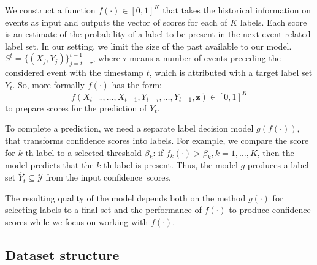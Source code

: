 \documentclass[runningheads]{llncs}
\newcommand{\vecX}{\mathbf{x}}
\begin{document}

We construct a function $f(\cdot) \in [0, 1]^K$ that takes the historical information on events as input and outputs the vector of scores for each of $K$ labels. Each score is an estimate of the probability of a label to be present in the next event-related label set.
In our setting, we limit the size of the past available to our model.
$S^t = \{(X_{j}, Y_{j})\}_{j = t - \tau}^{t-1}$, where $\tau$ means a number of events preceding the considered event with the timestamp $t$, which is attributed with a target label set $Y_{t}$.
So, more formally $f(\cdot)$ has the form:
$$
f(X_{t - \tau}, \ldots, X_{t-1}, Y_{t - \tau}, \ldots, Y_{t-1}, \textbf{z}) \in [0, 1]^K 
$$
to prepare scores for the prediction of $Y_{t}$.

To complete a prediction, we need a separate label decision model $g(f(\cdot))$, that transforms confidence scores into labels.
For example, we compare the score for $k$-th label to a selected threshold $\beta_k$: if $f_k(\cdot) > \beta_k, k = 1, \dots, K$, then the model predicts that the $k$-th label is present. Thus, the model $g$ produces a label set $\hat{Y}_{t} \subseteq \mathcal{Y}$ from the input confidence~scores.

The resulting quality of the model depends both on the method $g(\cdot)$ for selecting labels to a final set and the performance of $f(\cdot)$ to produce confidence scores while we focus on working with $f(\cdot)$. 

\subsection{Dataset structure} 
\label{sec:data_structure}
\end{document}
